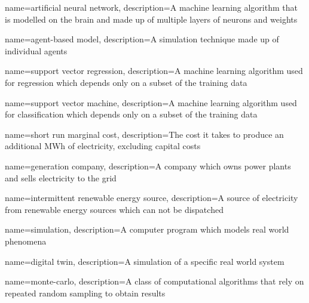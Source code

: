 {
        name=artificial neural network,
        description={A machine learning algorithm that is modelled on the brain and made up of multiple layers of neurons and weights}
}



{
        name=agent-based model,
        description={A simulation technique made up of individual agents}
}




{
        name=support vector regression,
        description={A machine learning algorithm used for regression which depends only on a subset of the training data}
}




{
	name=support vector machine,
	description={A machine learning algorithm used for classification which depends only on a subset of the training data}
}






{
	name=short run marginal cost,
	description={The cost it takes to produce an additional MWh of electricity, excluding capital costs}
}



{
	name=generation company,
	description={A company which owns power plants and sells electricity to the grid}
}




{
	name=intermittent renewable energy source,
	description={A source of electricity from renewable energy sources which can not be dispatched}
}





{
	name=simulation,
	description={A computer program which models real world phenomena}
}



{
	name=digital twin,
	description={A simulation of a specific real world system}
}


{
	name=monte-carlo,
	description={A class of computational algorithms that rely on repeated random sampling to obtain results}
}



